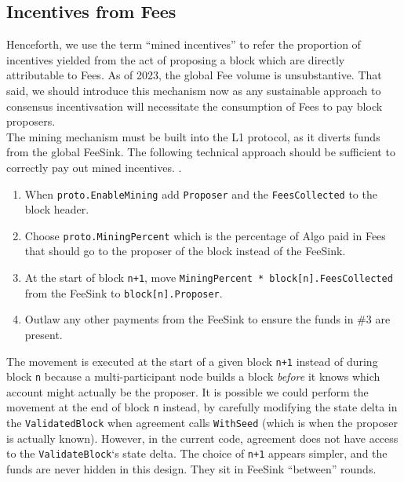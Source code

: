 \documentclass[11pt,a4paper]{article}
\begin{document}
\subsection{Incentives from Fees}
Henceforth, we use the term “mined incentives” to refer the proportion of incentives yielded from the act of proposing 
a block which are directly attributable to Fees. As of 2023, the global Fee volume is unsubstantive. That said, we 
should introduce this mechanism now as any sustainable approach to consensus incentivsation will necessitate the 
consumption of Fees to pay block proposers. \\

The mining mechanism must be built into the L1 protocol, as it diverts funds from the global \gls{FeeSink}. The 
following technical approach should be sufficient to correctly pay out mined incentives.
. 

\begin{enumerate}
    \item When \texttt{proto.EnableMining} add \texttt{Proposer} and the \texttt{FeesCollected} to the block header.
    \item Choose \texttt{proto.MiningPercent} which is the percentage of Algo paid in Fees that should go to the 
          proposer of the block instead of the \gls{FeeSink}.
    \item At the start of block \texttt{n+1}, move \texttt{MiningPercent * block[n].FeesCollected} from the 
          \gls{FeeSink} to \texttt{block[n].Proposer}.
    \item Outlaw any other payments from the \gls{FeeSink} to ensure the funds in \#3 are present.

\end{enumerate}

The movement is executed at the start of a given block \texttt{n+1} instead of during block \texttt{n} because a 
multi-participant node builds a block \textit{before} it knows which account might actually be the proposer. It is 
possible we could perform the movement at the end of block \texttt{n} instead, by carefully modifying the state delta in 
the \texttt{ValidatedBlock} when agreement calls \texttt{WithSeed} (which is when the proposer is actually known). 
However, in the current code, agreement does not have access to the \texttt{ValidateBlock}‘s state delta. The choice of 
\texttt{n+1} appears simpler, and the funds are never hidden in this design. They sit in \gls{FeeSink} “between” rounds.
\end{document}
